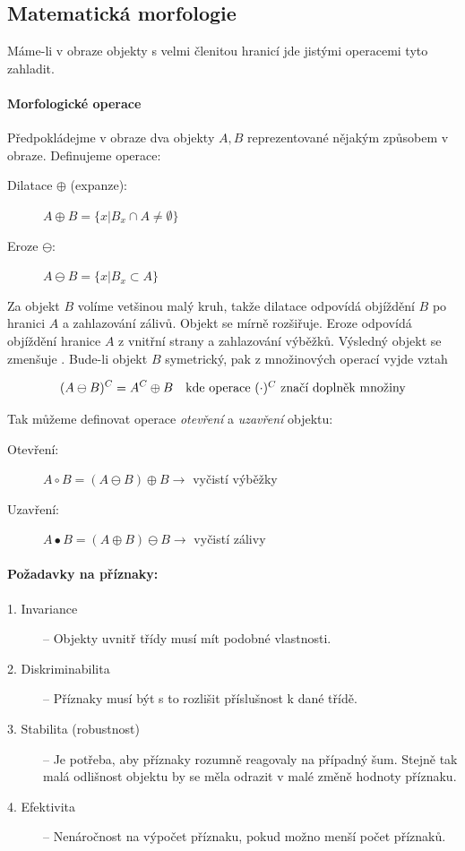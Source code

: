 
\subsection{Matematická morfologie}
Máme-li v obraze objekty s velmi členitou hranicí jde jistými operacemi tyto  zahladit.

\paragraph{Morfologické operace}
Předpokládejme v obraze dva objekty $A,B$ reprezentované nějakým způsobem v obraze. Definujeme operace:
\begin{description}
	\item[Dilatace $\oplus$ (expanze):] $A\oplus B=\{x|B_x\cap A\neq \emptyset\}$
	\item[Eroze $\ominus$:] $A\ominus B=\{x|B_x\subset A\}$
\end{description}

Za objekt $B$ volíme vetšinou malý kruh, takže dilatace odpovídá objíždění $B$ po hranici $A$ a zahlazování zálivů.
Objekt se mírně rozšiřuje. Eroze odpovídá objíždění hranice $A$ z vnitřní strany a zahlazování výběžků. Výsledný objekt
se zmenšuje .
Bude-li objekt $B$ symetrický, pak z množinových operací vyjde vztah

\begin{equation}
(A\ominus B)^C=A^C\oplus B\quad\hbox{kde operace $(\cdot)^C$ značí doplněk množiny}
\end{equation}

Tak můžeme definovat operace \emph{otevření} a \emph{uzavření} objektu:
\begin{description}
	\item[Otevření:] $A\circ B=(A\ominus B)\oplus B$\quad$\rightarrow$ vyčistí výběžky
	\item[Uzavření:] $A\bullet B=(A\oplus B)\ominus B$\quad$\rightarrow$ vyčistí zálivy
\end{description}

\paragraph{Požadavky na příznaky:}
\begin{description}
	\item[1. Invariance] -- Objekty uvnitř třídy musí mít podobné vlastnosti.
	\item[2. Diskriminabilita] -- Příznaky musí být s to rozlišit příslušnost k dané třídě.
	\item[3. Stabilita (robustnost)] -- Je potřeba, aby příznaky rozumně reagovaly na případný šum. Stejně tak malá odlišnost
	objektu by se měla odrazit v malé změně hodnoty příznaku.
	\item[4. Efektivita] -- Nenáročnost na výpočet příznaku, pokud možno menší počet příznaků.
\end{description}

